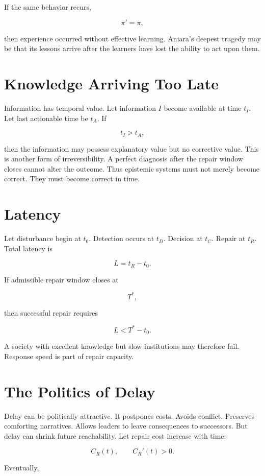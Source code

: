 \documentclass[11pt,oneside]{book}
\theoremstyle{definition}
\theoremstyle{remark}
\begin{document}
If the same behavior recurs,

\[
\pi'=\pi,
\]

then experience occurred without effective learning. Aniara's deepest tragedy may be that its
lessons arrive after the learners have lost the ability to act upon them.

\section{Knowledge Arriving Too Late}

Information has temporal value. Let information \(I\) become available at time \(t_I\). Let last
actionable time be \(t_A\). If

\[
t_I>t_A,
\]

then the information may possess explanatory value but no corrective value. This is another form of
irreversibility. A perfect diagnosis after the repair window closes cannot alter the outcome. Thus
epistemic systems must not merely become correct. They must become correct in time.

\section{Latency}

Let disturbance begin at \(t_0\). Detection occurs at \(t_D\). Decision at \(t_C\). Repair at
\(t_R\). Total latency is

\[
L = t_R-t_0.
\]

If admissible repair window closes at

\[
T^\ast,
\]

then successful repair requires

\[
L<T^\ast-t_0.
\]

A society with excellent knowledge but slow institutions may therefore fail. Response speed is part
of repair capacity.

\section{The Politics of Delay}

Delay can be politically attractive. It postpones costs. Avoids conflict. Preserves comforting
narratives. Allows leaders to leave consequences to successors. But delay can shrink future
reachability. Let repair cost increase with time:

\[
C_R(t), \qquad C_R'(t)>0.
\]

Eventually,
\end{document}
